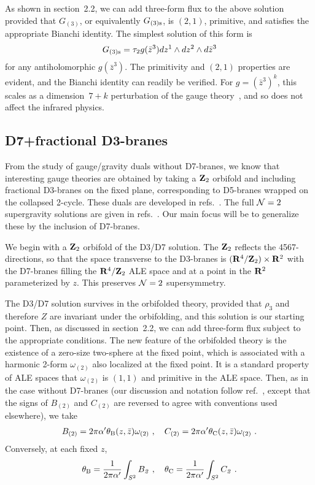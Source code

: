 \documentclass[a4paper,12pt]{article}
\renewcommand{\=}[1]{\bar{#1}}
\begin{document}
As shown in section~2.2, we can add
three-form flux to the above solution provided that $G_{(3)}$, or equivalently
$G_{(3)\rm s}$,  is $(2,1)$, primitive, and satisfies the appropriate Bianchi
identity.  The simplest solution of this form is
\begin{equation}
G_{(3)\rm s} = \tau_2 g(\bar z^3) dz^1 \wedge dz^2 \wedge d\bar z^3
\end{equation}
for any antiholomorphic $g(\bar z^3)$.
The primitivity and $(2,1)$ properties are evident, and the Bianchi identity can
readily be verified.  For $g = (\bar z^3)^k$, this scales as a dimension~$7+k$
perturbation of the gauge theory~\cite{WGKP},
and so does not affect the infrared physics.

\subsection{D7+fractional D3-branes}

From the study of gauge/gravity duals without D7-branes, we know that
interesting gauge theories are obtained by taking a ${\bf Z}_2$ orbifold and
including fractional D3-branes on the fixed plane, corresponding to D5-branes
wrapped on the collapsed 2-cycle.  These duals are developed in
refs.~\cite{GK-KN}.  The full ${\cal N}=2$ supergravity solutions are given in
refs.~\cite{n2,n2me}.  Our main focus will be to generalize these by the
inclusion of D7-branes.

We begin with a ${\bf Z}_2$ orbifold of the D3/D7 solution.  The ${\bf Z}_2$
reflects the 4567-directions, so that the space transverse to the D3-branes is
$({\bf R}^4/{\bf Z}_2) \times {\bf R}^2$ with the D7-branes filling the ${\bf
R}^4/{\bf Z}_2$ ALE space and at a point in the ${\bf R}^2$ parameterized by
$z$.  This preserves ${\cal N} = 2$ supersymmetry.

The D3/D7 solution survives in the orbifolded
theory, provided that $\rho_3$ and therefore $Z$ are invariant under
the orbifolding, and this solution is our starting point.  Then, as discussed in
section~2.2, we can add three-form flux subject to the appropriate conditions.
The new feature of the orbifolded theory is the existence of a zero-size
two-sphere at the fixed point, which is associated with a harmonic
2-form $\omega_{(2)}$ also localized at the fixed point.
It is a standard
property of ALE spaces that $\omega_{(2)}$ is $(1,1)$ and primitive in the ALE
space.  Then, as in the case without D7-branes (our discussion and notation
follow ref.~\cite{n2me}, except that the signs of $B_{(2)}$ and $C_{(2)}$
are reversed to agree with conventions used elsewhere), we take
\begin{eqnarray}
B_{(2)}= 2\pi\alpha' \theta_{\rm B}(z,\bar{z})\omega_{(2)}\ , \quad
C_{(2)}= 2\pi\alpha' \theta_{\rm C}(z,\bar{z})\omega_{(2)}\ .
\label{pot}
\end{eqnarray}
Conversely, at each fixed $z$,
\begin{equation}
\theta_{\rm B} = \frac{1}{2\pi\alpha'} \int_{S^2} B_{\it 2}\ ,\quad
\theta_{\rm C} = \frac{1}{2\pi\alpha'} \int_{S^2} C_{\it 2}\ .
\end{equation}
\end{document}
